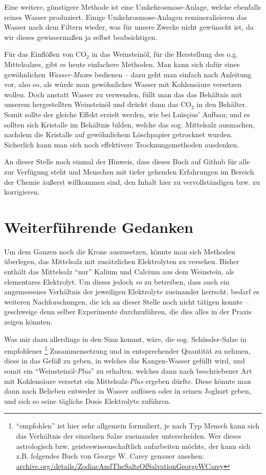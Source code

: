\documentclass[a5paper,fontsize=10pt]{memoir}
\begin{document}
Eine weitere, günstigere Methode ist eine Umkehrosmose-Anlage, welche ebenfalls reines Wasser produziert. Einige Umkehrosmose-Anlagen remineralisieren das Wasser nach dem Filtern wieder, was für unsere Zwecke nicht gewünscht ist, da wir dieses gewissermaßen ja selbst beabsichtigen.

Für das Einflößen von CO$_2$ in das Weinsteinöl, für die Herstellung des o.g. Mittelsalzes, gibt es heute einfachere Methoden. Man kann sich dafür eines gewöhnlichen \emph{Wasser-Max}es bedienen -- dazu geht man einfach nach Anleitung vor, also so, als würde man gewöhnliches Wasser mit Kohlensäure versetzen wollen. Doch anstatt Wasser zu verwenden, füllt man das das Behältnis mit unserem hergestellten Weinsteinöl und drückt dann das CO$_2$ in den Behälter. Somit sollte der gleiche Effekt erzielt werden, wie bei Luïsçius' Aufbau; und es sollten sich Kristalle im Behältnis bilden, welche das sog. Mittelsalz ausmachen, nachdem die Kristalle auf gewöhnlichem Löschpapier getrocknet wurden. Sicherlich kann man sich noch effektivere Trocknungsmethoden ausdenken.

An dieser Stelle noch einmal der Hinweis, dass dieses
Buch auf Github für alle zur Verfügung steht und
Menschen mit tiefer gehenden Erfahrungen
im Bereich der Chemie äußerst willkommen sind,
den Inhalt hier zu vervollständigen bzw. zu korrigieren.


\section{Weiterführende Gedanken}

Um dem Ganzen noch die Krone auszusetzen, könnte man sich Methoden überlegen, das Mittelsalz mit zusätzlichen Elektrolyten zu versehen. Bisher enthält das Mittelsalz ``nur'' Kalium und Calcium aus dem Weinstein, als elementares Elektrolyt. Um dieses jedoch \emph{so} zu betreiben, dass auch ein angemessenes Verhältnis der jeweiligen Elektrolyte zueinander herrscht, bedarf es weiteren Nachforschungen, die ich an dieser Stelle noch nicht tätigen konnte -- geschweige denn selber Experimente durchzuführen, die dies alles in der Praxis zeigen könnten.

Was mir dazu allerdings in den Sinn kommt, wäre, die sog. Schüssler-Salze in empfohlener%
\footnote{``empfohlen'' ist hier sehr allgemein formuliert, je nach Typ Mensch kann sich das Verhältnis der einzelnen Salze zueinander unterscheiden. Wer dieses astrologisch bzw. geisteswissenschaftlich aufarbeiten möchte, der kann sich z.B. folgendes Buch von George W. Carey genauer ansehen: \href{https://archive.org/details/ZodiacAndTheSaltsOfSalvationGeorgeWCarey}{archive.org/details/ZodiacAndTheSaltsOfSalvationGeorgeWCarey}}
Zusammensetzung und in entsprechender Quantität zu nehmen, diese in das Gefäß zu geben, in welches das Kangen-Wasser gefüllt wird, und somit ein ``Weinsteinöl-\emph{Plus}'' zu erhalten, welches dann nach beschriebener Art mit Kohlensäure versetzt ein Mittelsalz-\emph{Plus} ergeben dürfte. Diese könnte man dann nach Belieben entweder in Wasser auflösen oder in seinen Joghurt geben, und sich so seine tägliche Dosis Elektrolyte zuführen.
\end{document}
